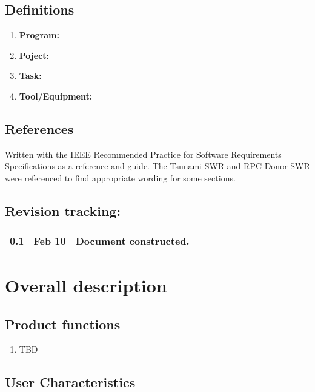 \documentclass[12pt,a4paper]{article}
\begin{document}
\subsection{Definitions}
\begin{enumerate}
\item \textbf{Program:}  
\item \textbf{Poject:}  
\item \textbf{Task:}  
\item \textbf{Tool/Equipment:}  
\end{enumerate}

\subsection{References}
Written with the IEEE Recommended Practice for Software Requirements Specifications as a reference and guide. The Tsunami SWR and RPC Donor SWR were referenced to find appropriate wording for some sections.

\subsection{Revision tracking:}
\begin{tabular}{|l|r|p{5.5in}|}
\hline
0.1 & Feb 10 & Document constructed.\\
\hline
\end{tabular}

\section{Overall description}
\subsection{Product functions}


\begin{enumerate}
\item TBD
\end{enumerate}

\subsection{User Characteristics}
\end{document}
